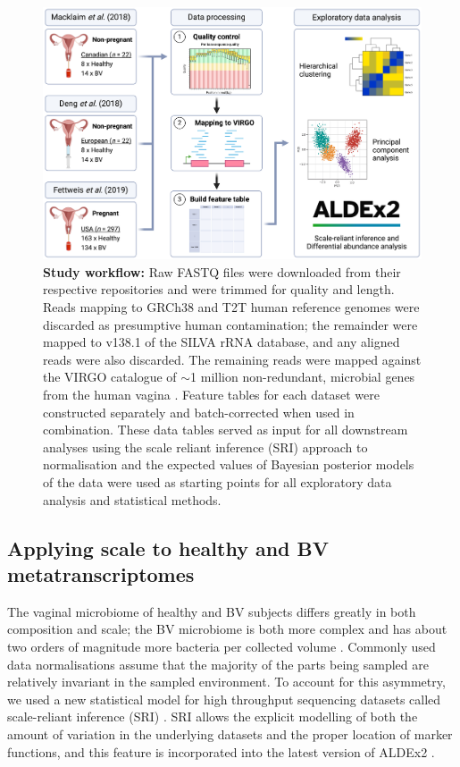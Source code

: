 \documentclass[sn-mathphys,Numbered]{sn-jnl}%
\begin{document}
\begin{figure}[H]%
    \centering
    \includegraphics[scale=0.4]{3_Workflow.png}
    \caption{\textbf{Study workflow:} Raw FASTQ files were downloaded from their respective repositories and were trimmed for quality and length. Reads mapping to GRCh38 and T2T human reference genomes were discarded as presumptive human contamination; the remainder were mapped to v138.1 of the SILVA rRNA database, and any aligned reads were also discarded. The remaining reads were mapped against the VIRGO catalogue of $\sim$1 million non-redundant, microbial genes from the human vagina \cite{Ma:2020aa}. Feature tables for each dataset were constructed separately and batch-corrected \cite{Zhang:2020ab} when used in combination. These data tables served as input for all downstream analyses using the scale reliant inference (SRI) approach to normalisation \cite{nixon2023scale} and the expected values of Bayesian posterior models of the data were used as starting points for all exploratory data analysis and statistical methods.} \label{fig:figWorkflow}
\end{figure}

\subsection{Applying scale to healthy and BV metatranscriptomes} 
The vaginal microbiome of healthy and BV subjects differs greatly in both composition and scale; the BV microbiome is both more complex and has about two orders of magnitude more bacteria per collected volume \citep{Zozaya:2010}. Commonly used data normalisations assume that the majority of the parts being sampled are relatively invariant in the sampled environment. To account for this asymmetry, we used a new statistical model for high throughput sequencing datasets called scale-reliant inference (SRI) \citep{nixon2023scale}. SRI allows the explicit modelling of both the amount of variation in the underlying datasets and the proper location of marker functions, and this feature is incorporated into the latest version of ALDEx2 \citep{fernandes:2014, gloorScale}. 
\end{document}
